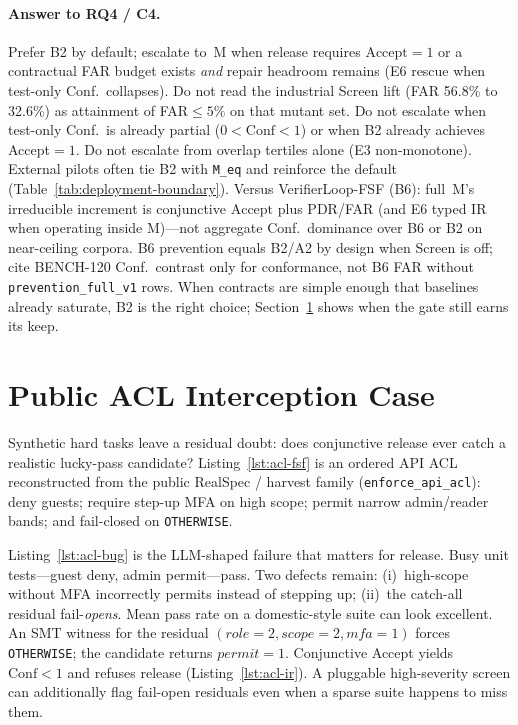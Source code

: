 \paragraph{Answer to RQ4 / C4.}
Prefer B2 by default; escalate to~M when release requires
$\mathrm{Accept}{=}1$ or a contractual FAR budget exists \emph{and} repair
headroom remains (E6 rescue when test-only Conf.\ collapses).
Do not read the industrial Screen lift (FAR 56.8\% to 32.6\%) as attainment of
FAR${\le}5\%$ on that mutant set.
Do not escalate when test-only Conf.\ is already partial ($0{<}\mathrm{Conf}{<}1$)
or when B2 already achieves Accept${=}1$.
Do not escalate from overlap tertiles alone (E3 non-monotone).
External pilots often tie B2 with \texttt{M\_eq} and reinforce the default
(Table~\ref{tab:deployment-boundary}).
Versus VerifierLoop-FSF (B6): full~M's irreducible increment is conjunctive
$\mathrm{Accept}$ plus PDR/FAR (and E6 typed IR when operating inside M)---not
aggregate Conf.\ dominance over B6 or B2 on near-ceiling corpora.
B6 prevention equals B2/A2 by design when Screen is off; cite BENCH-120
Conf.\ contrast only for conformance, not B6 FAR without
\texttt{prevention\_full\_v1} rows.
When contracts are simple enough that baselines already saturate, B2 is the
right choice; Section~\ref{sec:results:acl-case} shows when the gate still
earns its keep.

\section{Public ACL Interception Case}
\label{sec:results:acl-case}

Synthetic hard tasks leave a residual doubt: does conjunctive release ever
catch a realistic lucky-pass candidate?
Listing~\ref{lst:acl-fsf} is an ordered API ACL reconstructed from the
public RealSpec / harvest family (\texttt{enforce\_api\_acl}): deny guests;
require step-up MFA on high scope; permit narrow admin/reader bands; and
fail-closed on \texttt{OTHERWISE}.

Listing~\ref{lst:acl-bug} is the LLM-shaped failure that matters for release.
Busy unit tests---guest deny, admin permit---pass.
Two defects remain: (i)~high-scope without MFA incorrectly permits instead of
stepping up; (ii)~the catch-all residual fail-\emph{opens}.
Mean pass rate on a domestic-style suite can look excellent.
An SMT witness for the residual
$(\mathit{role}{=}2,\mathit{scope}{=}2,\mathit{mfa}{=}1)$ forces
\texttt{OTHERWISE}; the candidate returns $\mathit{permit}{=}1$.
Conjunctive Accept yields $\mathrm{Conf}<1$ and refuses release
(Listing~\ref{lst:acl-ir}).
A pluggable high-severity screen can additionally flag fail-open residuals
even when a sparse suite happens to miss them.

